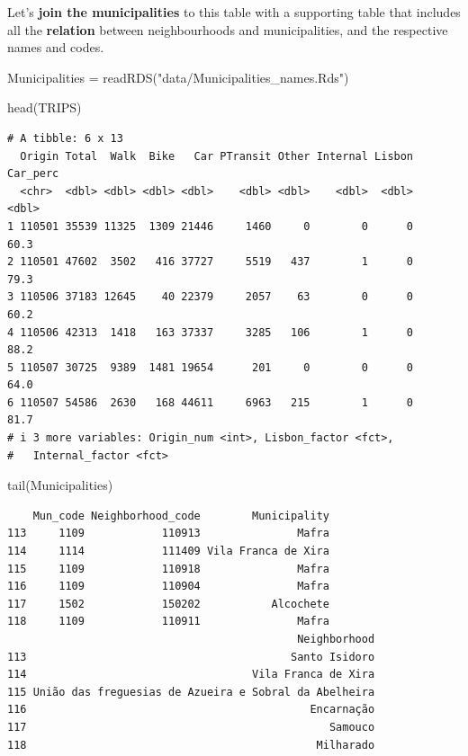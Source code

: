 \documentclass[
  letterpaper,
  DIV=11,
  numbers=noendperiod]{scrreprt}
\newenvironment{Shaded}{\begin{snugshade}}{\end{snugshade}}
\newcommand{\FunctionTok}[1]{\textcolor[rgb]{0.28,0.35,0.67}{#1}}
\newcommand{\NormalTok}[1]{\textcolor[rgb]{0.00,0.23,0.31}{#1}}
\newcommand{\OtherTok}[1]{\textcolor[rgb]{0.00,0.23,0.31}{#1}}
\newcommand{\StringTok}[1]{\textcolor[rgb]{0.13,0.47,0.30}{#1}}
\begin{document}
Let's \textbf{join the municipalities} to this table with a supporting
table that includes all the \textbf{relation} between neighbourhoods and
municipalities, and the respective names and codes.

\begin{Shaded}
\begin{Highlighting}[]
\NormalTok{Municipalities }\OtherTok{=} \FunctionTok{readRDS}\NormalTok{(}\StringTok{"data/Municipalities\_names.Rds"}\NormalTok{)}
\end{Highlighting}
\end{Shaded}

\begin{Shaded}
\begin{Highlighting}[]
\FunctionTok{head}\NormalTok{(TRIPS)}
\end{Highlighting}
\end{Shaded}

\begin{verbatim}
# A tibble: 6 x 13
  Origin Total  Walk  Bike   Car PTransit Other Internal Lisbon Car_perc
  <chr>  <dbl> <dbl> <dbl> <dbl>    <dbl> <dbl>    <dbl>  <dbl>    <dbl>
1 110501 35539 11325  1309 21446     1460     0        0      0     60.3
2 110501 47602  3502   416 37727     5519   437        1      0     79.3
3 110506 37183 12645    40 22379     2057    63        0      0     60.2
4 110506 42313  1418   163 37337     3285   106        1      0     88.2
5 110507 30725  9389  1481 19654      201     0        0      0     64.0
6 110507 54586  2630   168 44611     6963   215        1      0     81.7
# i 3 more variables: Origin_num <int>, Lisbon_factor <fct>,
#   Internal_factor <fct>
\end{verbatim}

\begin{Shaded}
\begin{Highlighting}[]
\FunctionTok{tail}\NormalTok{(Municipalities)}
\end{Highlighting}
\end{Shaded}

\begin{verbatim}
    Mun_code Neighborhood_code        Municipality
113     1109            110913               Mafra
114     1114            111409 Vila Franca de Xira
115     1109            110918               Mafra
116     1109            110904               Mafra
117     1502            150202           Alcochete
118     1109            110911               Mafra
                                             Neighborhood
113                                         Santo Isidoro
114                                   Vila Franca de Xira
115 União das freguesias de Azueira e Sobral da Abelheira
116                                            Encarnação
117                                               Samouco
118                                             Milharado
\end{verbatim}
\end{document}
